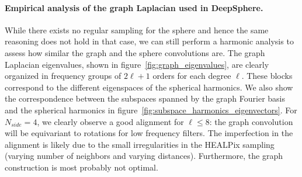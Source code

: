 \documentclass{article} %
\newcommand{\figref}[1]{figure~\ref{fig:#1}}
\renewcommand{\b}[1]{{\bm{#1}}}   %
\newcommand{\1}{\b{1}}              %
\newcommand{\0}{\b{0}}              %
\renewcommand{\L}{\b{L}}
\newcommand{\todo}[1]{{\color[rgb]{.6,.1,.6}{#1}}}
\begin{document}
\paragraph{Empirical analysis of the graph Laplacian used in DeepSphere.} 
While there exists no regular sampling for the sphere and hence the same reasoning does not hold in that case, we can still perform a harmonic analysis to assess how similar the graph and the sphere convolutions are.
The graph Laplacian eigenvalues, shown in \figref{graph_eigenvalues}, are clearly organized in frequency groups of $2\ell + 1$ orders for each degree $\ell$.
These blocks correspond to the different eigenspaces of the spherical harmonics.
We also show the correspondence between the subspaces spanned by the graph Fourier basis and the spherical harmonics in \figref{subspace_harmonics_eigenvectors}.
For $N_{side}=4$, we clearly observe a good alignment for $\ell \leq 8$: the graph convolution will be equivariant to rotations for low frequency filters.
The imperfection in the alignment is likely due to the small irregularities in the HEALPix sampling (varying number of neighbors and varying distances).
Furthermore, the graph construction is most probably not optimal.


\end{document}
